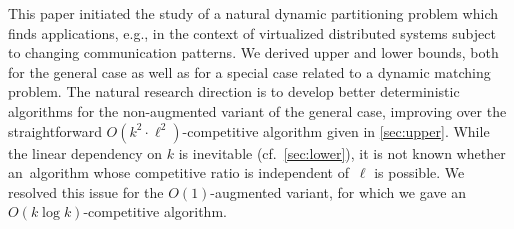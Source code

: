 \documentclass[11pt,a4paper]{scrartcl}
\begin{document}
This paper initiated the study of a natural dynamic partitioning problem which
finds applications, e.g., in the context of virtualized distributed systems
subject to changing communication patterns. We derived upper and lower bounds,
both for the general case as well as for a special case related to a dynamic
matching problem. The natural research direction is to develop better
deterministic algorithms for the non-augmented variant of the general case,
improving over the straightforward $O(k^2 \cdot \ell^2)$-competitive algorithm
given in \cref{sec:upper}. While the linear dependency on $k$ is
inevitable (cf.~\cref{sec:lower}), it is not known whether
an~algorithm whose competitive ratio is independent of~$\ell$ is possible. We
resolved this issue for the $O(1)$-augmented variant, for which we gave an
$O(k \log k)$-competitive algorithm.



\end{document}
